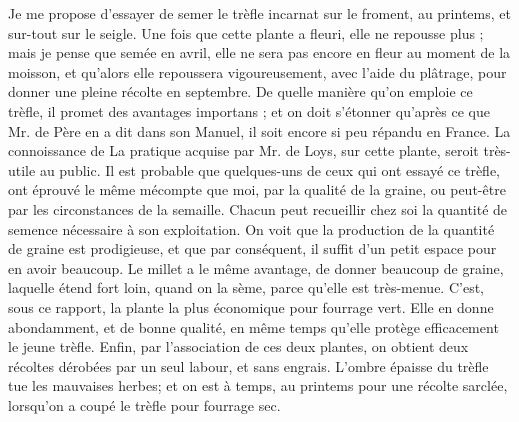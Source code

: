 Je me propose d'essayer de semer le trèfle incarnat sur le froment, au printems, et sur-tout sur le seigle. Une fois que cette plante a fleuri, elle ne repousse plus ; mais je pense que semée en avril, elle ne sera pas encore en fleur au moment de la moisson, et qu'alors elle repoussera vigoureusement, avec l'aide du plâtrage, pour donner une pleine récolte en septembre.
De quelle manière qu'on emploie ce trèfle, il promet des avantages importans ; et on doit s'étonner qu'après ce que Mr. de Père en a dit dans son Manuel, il soit encore si peu répandu en France. La connoissance de\setcounter{page}{268} La pratique acquise par Mr. de Loys, sur cette plante, seroit très-utile au public. Il est probable que quelques-uns de ceux qui ont essayé ce trèfle, ont éprouvé le même mécompte que moi, par la qualité de la graine, ou peut-être par les circonstances de la semaille. Chacun peut recueillir chez soi la quantité de semence nécessaire à son exploitation. On voit que la production de la quantité de graine est prodigieuse, et que par conséquent, il suffit d'un petit espace pour en avoir beaucoup.
Le millet a le même avantage, de donner beaucoup de graine, laquelle étend fort loin, quand on la sème, parce qu'elle est très-menue. C'est, sous ce rapport, la plante la plus économique pour fourrage vert. Elle en donne abondamment, et de bonne qualité, en même temps qu'elle protège efficacement le jeune trèfle. Enfin, par l'association de ces deux plantes, on obtient deux récoltes dérobées par un seul labour, et sans engrais. L'ombre épaisse du trèfle tue les mauvaises herbes; et on est à temps, au printems pour une récolte sarclée, lorsqu'on a coupé le trèfle pour fourrage sec.
